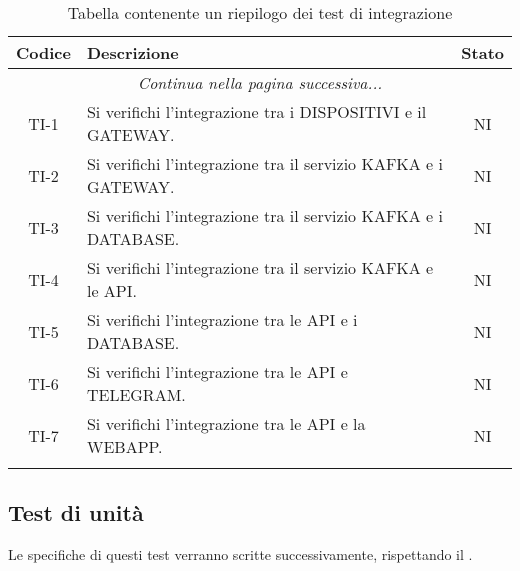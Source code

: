 		\begin{center}
			\begin{longtable}{|c|p{12cm}|c|}
			\hline
			\rowcolor{lighter-grayer}
			\textbf{Codice} & \textbf{Descrizione} & \textbf{Stato}  \\ %
			\hline
			\endhead
			\hline
	        \multicolumn{3}{|c|}{\textit{Continua nella pagina successiva...}}\\
	        \hline
	        \endfoot
	        \endlastfoot

			\hline
			TI-1 & Si verifichi l'integrazione tra i DISPOSITIVI e il GATEWAY. & NI \\
			\hline
			TI-2 & Si verifichi l'integrazione tra il servizio KAFKA e i GATEWAY. & NI \\
			\hline
			TI-3 & Si verifichi l'integrazione tra il servizio KAFKA e i DATABASE. & NI \\
			\hline
			TI-4 & Si verifichi l'integrazione tra il servizio KAFKA e le API. & NI \\
			\hline
			TI-5 & Si verifichi l'integrazione tra le API e i DATABASE. & NI \\
			\hline
			TI-6 & Si verifichi l'integrazione tra le API e TELEGRAM. & NI \\
			\hline
			TI-7 & Si verifichi l'integrazione tra le API e la WEBAPP. & NI \\
			\hline
			 
			\caption{Tabella contenente un riepilogo dei test di integrazione}
			\end{longtable}
		\end{center}

	\subsection{Test di unità}
	 	Le specifiche di questi test verranno scritte successivamente, rispettando il .
